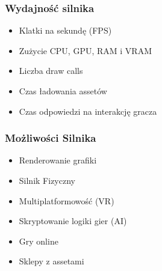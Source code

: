 \begin{frame} 
  \frametitle{Wydajność silnika}
  \begin{itemize}
    \item Klatki na sekundę (FPS)
    \item Zużycie CPU, GPU, RAM i VRAM
    \item Liczba draw calls 
    \item Czas ładowania assetów 
    \item Czas odpowiedzi na interakcję gracza
  \end{itemize} 
\end{frame}
\begin{frame}
    \frametitle{Możliwości Silnika}
    \begin{itemize}
        \item Renderowanie grafiki 
        \item Silnik Fizyczny 
        \item Multiplatformowość (VR)
        \item Skryptowanie logiki gier (AI)
        \item Gry online
        \item Sklepy z assetami
    \end{itemize}
  \end{frame}
